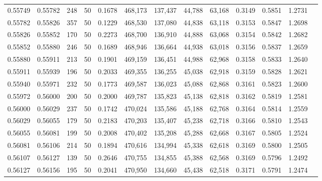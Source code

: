 \begin{tabular}{rrrrrrrrrrrrr}
0.55749 & 0.55782 &   248 &  50 &                                     0.1678 & 468,173 & 137,437 &  44,788 &  63,168 & 0.3149 & 0.5851 & 1.2731 \\
0.55782 & 0.55826 &   357 &  50 &                                     0.1229 & 468,530 & 137,080 &  44,838 &  63,118 & 0.3153 & 0.5847 & 1.2698 \\
0.55826 & 0.55852 &   170 &  50 &                                     0.2273 & 468,700 & 136,910 &  44,888 &  63,068 & 0.3154 & 0.5842 & 1.2682 \\
0.55852 & 0.55880 &   246 &  50 &                                     0.1689 & 468,946 & 136,664 &  44,938 &  63,018 & 0.3156 & 0.5837 & 1.2659 \\
0.55880 & 0.55911 &   213 &  50 &                                     0.1901 & 469,159 & 136,451 &  44,988 &  62,968 & 0.3158 & 0.5833 & 1.2640 \\
0.55911 & 0.55939 &   196 &  50 &                                     0.2033 & 469,355 & 136,255 &  45,038 &  62,918 & 0.3159 & 0.5828 & 1.2621 \\
0.55940 & 0.55971 &   232 &  50 &                                     0.1773 & 469,587 & 136,023 &  45,088 &  62,868 & 0.3161 & 0.5823 & 1.2600 \\
0.55972 & 0.56000 &   200 &  50 &                                     0.2000 & 469,787 & 135,823 &  45,138 &  62,818 & 0.3162 & 0.5819 & 1.2581 \\
0.56000 & 0.56029 &   237 &  50 &                                     0.1742 & 470,024 & 135,586 &  45,188 &  62,768 & 0.3164 & 0.5814 & 1.2559 \\
0.56029 & 0.56055 &   179 &  50 &                                     0.2183 & 470,203 & 135,407 &  45,238 &  62,718 & 0.3166 & 0.5810 & 1.2543 \\
0.56055 & 0.56081 &   199 &  50 &                                     0.2008 & 470,402 & 135,208 &  45,288 &  62,668 & 0.3167 & 0.5805 & 1.2524 \\
0.56081 & 0.56106 &   214 &  50 &                                     0.1894 & 470,616 & 134,994 &  45,338 &  62,618 & 0.3169 & 0.5800 & 1.2505 \\
0.56107 & 0.56127 &   139 &  50 &                                     0.2646 & 470,755 & 134,855 &  45,388 &  62,568 & 0.3169 & 0.5796 & 1.2492 \\
0.56127 & 0.56156 &   195 &  50 &                                     0.2041 & 470,950 & 134,660 &  45,438 &  62,518 & 0.3171 & 0.5791 & 1.2474 \\

\end{tabular}
